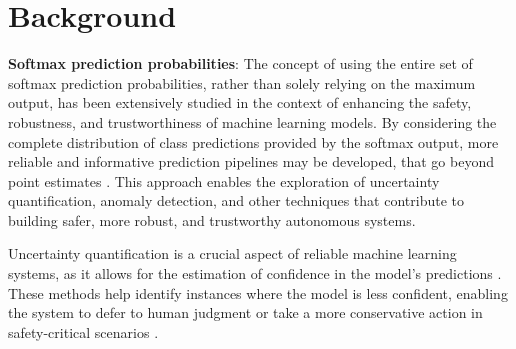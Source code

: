 
\section{Background}




\textbf{Softmax prediction probabilities}: The concept of using the entire set of softmax prediction probabilities, rather than solely relying on the maximum output, has been extensively studied in the context of enhancing the safety, robustness, and trustworthiness of machine learning models. By considering the complete distribution of class predictions provided by the softmax output, more reliable and informative prediction pipelines may be developed, that go beyond point estimates \cite{gal2016dropout}. This approach enables the exploration of uncertainty quantification, anomaly detection, and other techniques that contribute to building safer, more robust, and trustworthy autonomous systems.

Uncertainty quantification is a crucial aspect of reliable machine learning systems, as it allows for the estimation of confidence in the model's predictions \cite{kendall2017uncertainties}. 
These methods help identify instances where the model is less confident, enabling the system to defer to human judgment or take a more conservative action in safety-critical scenarios \cite{michelmore2018evaluating}.


